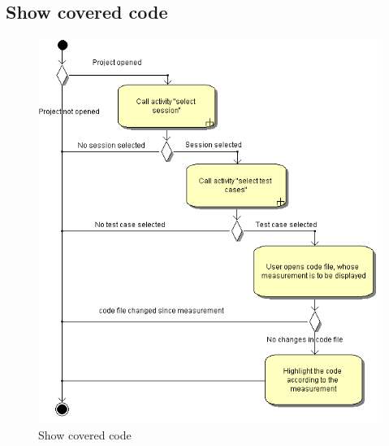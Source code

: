 \subsection{Show covered code}
\begin{figure}[htb]
 \centering
 \includegraphics[height=0.7\textheight]{images/Activities/show_covered_code.png}
 \caption{Show covered code}
 \label{ac_fg:show_covered_code}
\end{figure}
